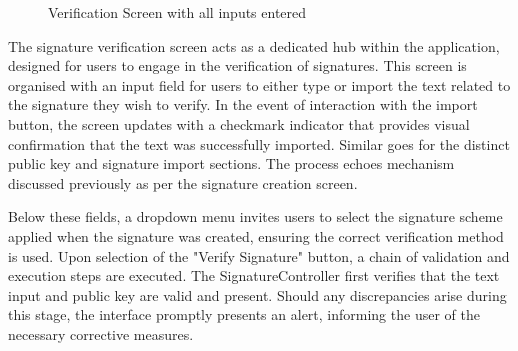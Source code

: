 \documentclass[]{final_report}
\theoremstyle{definition}
\begin{document}
\begin{figure}[H]
\begin{minipage}{0.49\textwidth}
        \caption{Verification Screen with all inputs entered}
        \label{fig:image2}
    \end{minipage}
\end{figure}

The signature verification screen acts as a dedicated hub within the application, designed for users to engage in the verification of signatures. This screen is organised with an input field for users to either type or import the text related to the signature they wish to verify. In the event of interaction with the import button, the screen updates with a checkmark indicator that provides visual confirmation that the text was successfully imported. Similar goes for the distinct public key and signature import sections. The process echoes mechanism discussed previously as per the signature creation screen.

Below these fields, a dropdown menu invites users to select the signature scheme applied when the signature was created, ensuring the correct verification method is used.
Upon selection of the "Verify Signature" button, a chain of validation and execution steps are executed. The SignatureController first verifies that the text input and public key are valid and present. Should any discrepancies arise during this stage, the interface promptly presents an alert, informing the user of the necessary corrective measures.
\end{document}
